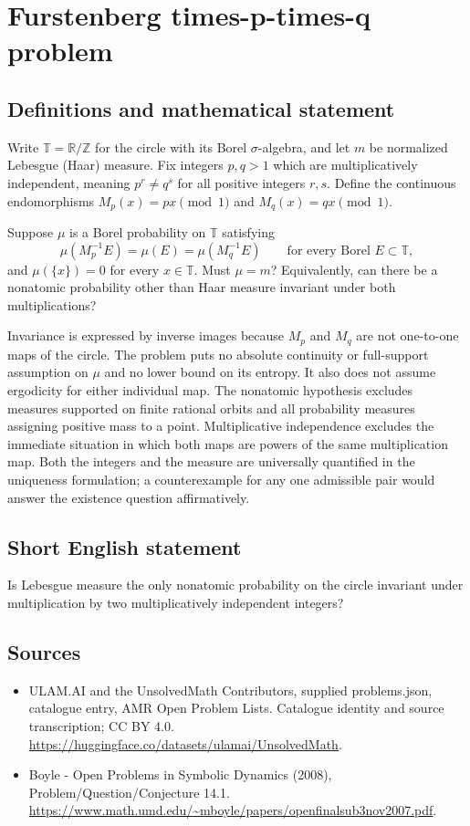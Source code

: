 \documentclass[11pt,a4paper]{article}
\begin{document}
\section*{Furstenberg times-p-times-q problem}\label{statement}

\subsection{Definitions and mathematical statement}
Write $\mathbb T=\mathbb R/\mathbb Z$ for the circle with its Borel
$\sigma$-algebra, and let $m$ be normalized Lebesgue (Haar) measure.
Fix integers $p,q>1$ which are multiplicatively independent, meaning
$p^r\ne q^s$ for all positive integers $r,s$. Define the continuous
endomorphisms $M_p(x)=px\pmod1$ and $M_q(x)=qx\pmod1$.

Suppose $\mu$ is a Borel probability on $\mathbb T$ satisfying
\[
 \mu(M_p^{-1}E)=\mu(E)=\mu(M_q^{-1}E)
 \qquad\text{for every Borel }E\subset\mathbb T,
\]
and $\mu(\{x\})=0$ for every $x\in\mathbb T$.
Must $\mu=m$? Equivalently, can there be a nonatomic probability other
than Haar measure invariant under both multiplications?

Invariance is expressed by inverse images because $M_p$ and $M_q$ are
not one-to-one maps of the circle. The problem puts no absolute continuity
or full-support assumption on $\mu$ and no lower bound on its entropy.
It also does not assume ergodicity for either individual map. The
nonatomic hypothesis excludes measures supported on finite rational
orbits and all probability measures assigning positive mass to a point.
Multiplicative independence excludes the immediate situation in which
both maps are powers of the same multiplication map. Both the integers
and the measure are universally quantified in the uniqueness formulation;
a counterexample for any one admissible pair would answer the existence
question affirmatively.
\subsection{Short English statement}
Is Lebesgue measure the only nonatomic probability on the circle invariant under multiplication by two multiplicatively independent integers?
\subsection{Sources}
\begin{itemize}
\item[S1] ULAM.AI and the UnsolvedMath Contributors, supplied problems.json, catalogue entry, AMR Open Problem Lists. Catalogue identity and source transcription; CC BY 4.0.
\url{https://huggingface.co/datasets/ulamai/UnsolvedMath}.
\item[S2] Boyle - Open Problems in Symbolic Dynamics (2008), Problem/Question/Conjecture 14.1. 
\url{https://www.math.umd.edu/~mboyle/papers/openfinalsub3nov2007.pdf}.
\end{itemize}
\end{document}
